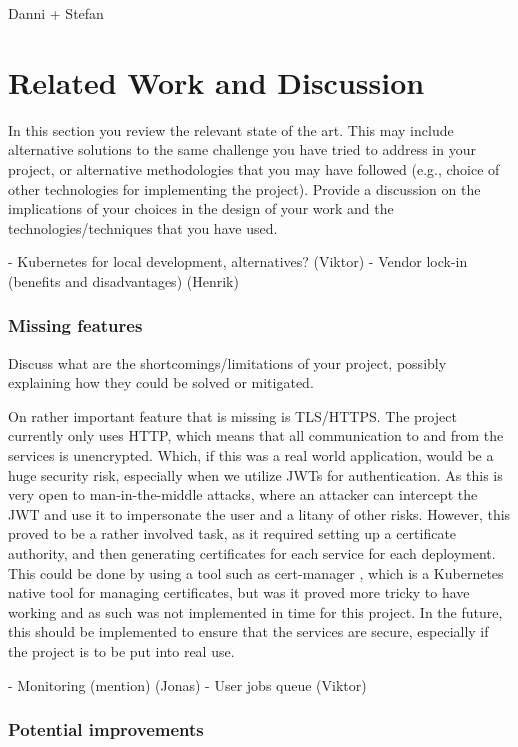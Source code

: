 \documentclass[a4paper,12pt]{article}
\begin{document}
Danni + Stefan

\section{Related Work and Discussion}

In this section you review the relevant state of the art. This may include
alternative solutions to the same challenge you have tried to address in your
project, or alternative methodologies that you may have followed (e.g., choice
of other technologies for implementing the project). Provide a discussion on the
implications of your choices in the design of your work and the
technologies/techniques that you have used.

- Kubernetes for local development, alternatives? (Viktor)
- Vendor lock-in (benefits and disadvantages) (Henrik)

\subsubsection{Missing features}

Discuss what are the shortcomings/limitations of
your project, possibly explaining how they could be solved or mitigated.

On rather important feature that is missing is TLS/HTTPS. 
The project currently only uses HTTP, which means that all communication to and from the services is unencrypted.
Which, if this was a real world application, would be a huge security risk, especially when we utilize JWTs for authentication.
As this is very open to man-in-the-middle attacks, where an attacker can intercept the JWT and use it to impersonate the user and a litany of other risks.
However, this proved to be a rather involved task, as it required setting up a certificate authority, and then generating certificates for each service for each deployment.
This could be done by using a tool such as cert-manager \cite{cert-manager}, which is a Kubernetes native tool for managing certificates,
but was it proved more tricky to have working and as such was not implemented in time for this project.
In the future, this should be implemented to ensure that the services are secure, especially if the project is to be put into real use.

- Monitoring (mention) (Jonas)
- User jobs queue (Viktor)

\subsubsection{Potential improvements}
\end{document}
